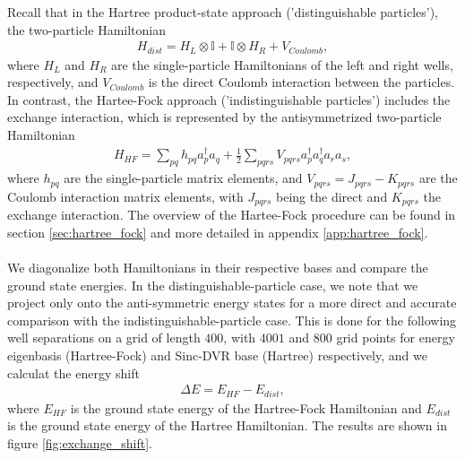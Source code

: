 \documentclass{subfiles}
\begin{document}
Recall that in the Hartree product-state approach ('distinguishable particles'), the two-particle Hamiltonian
\begin{align*}
    H_{dist} = H_L \otimes \mathbb{I} + \mathbb{I} \otimes H_R + V_{Coulomb},
\end{align*}
where $H_L$ and $H_R$ are the single-particle Hamiltonians of the left and right wells, respectively, and $V_{Coulomb}$ is the direct Coulomb interaction between the particles. In contrast, the Hartee-Fock approach ('indistinguishable particles') includes the exchange interaction, which is represented by the antisymmetrized two-particle Hamiltonian
\begin{align*}
    H_{HF} = \sum_{pq} h_{pq} a_p^\dagger a_q + \frac{1}{2} \sum_{pqrs} V_{pqrs} a_p^\dagger a_q^\dagger a_r a_s,
\end{align*}
where $h_{pq}$ are the single-particle matrix elements, and $V_{pqrs} = J_{pqrs} - K_{pqrs}$ are the Coulomb interaction matrix elements, with $J_{pqrs}$ being the direct and $K_{pqrs}$ the exchange interaction. The overview of the Hartee-Fock procedure can be found in section \ref{sec:hartree_fock} and more detailed in appendix \ref{app:hartree_fock}. \\\\
We diagonalize both Hamiltonians in their respective bases and compare the ground state energies. In the distinguishable-particle case, we note that we project only onto the anti-symmetric energy states for a more direct and accurate comparison with the indistinguishable-particle case. This is done for the following well separations on a grid of length $400$, with $4001$ and $800$ grid points for energy eigenbasis (Hartree-Fock) and Sinc-DVR base (Hartree) respectively, and we calculat the energy shift
\begin{align*}
    \Delta E = E_{HF} - E_{dist},
\end{align*}
where $E_{HF}$ is the ground state energy of the Hartree-Fock Hamiltonian and $E_{dist}$ is the ground state energy of the Hartree Hamiltonian. The results are shown in figure \ref{fig:exchange_shift}. 
\end{document}
